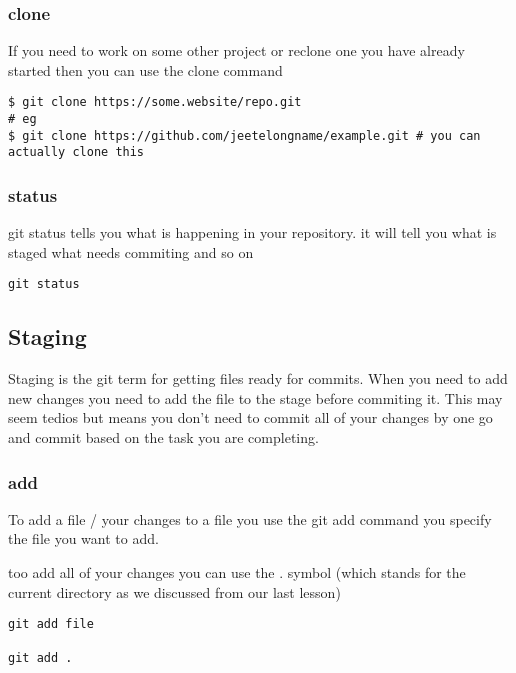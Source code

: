 \documentclass[a4paper]{article}
\begin{document}
\subsubsection*{clone}
\label{sec:org890cd74}
\begin{notes}
	If you need to work on some other project or reclone one you have already
	started then you can use the clone command
\end{notes}

\begin{verbatim}
$ git clone https://some.website/repo.git
# eg
$ git clone https://github.com/jeetelongname/example.git # you can actually clone this
\end{verbatim}
\subsubsection*{status}
\label{sec:orgf6b7056}
\begin{notes}
	git status tells you what is happening in your repository. it will tell you what
	is staged what needs commiting and so on
\end{notes}

\begin{verbatim}
git status
\end{verbatim}

\subsection*{Staging}
\label{sec:org8261356}
\begin{notes}
	Staging is the git term for getting files ready for commits. When you need to
	add new changes you need to add the file to the stage before commiting it. This
	may seem tedios but means you don't need to commit all of your changes by one go
	and commit based on the task you are completing.
\end{notes}
\subsubsection*{add}
\label{sec:org98019d8}
\begin{notes}
	To add a file / your changes to a file you use the git add command you specify
	the file you want to add.

	too add all of your changes you can use the . symbol (which stands for the
	current directory as we discussed from our last lesson)
\end{notes}
\begin{verbatim}
git add file

git add .
\end{verbatim}
\end{document}
